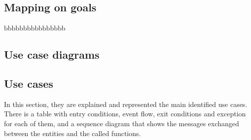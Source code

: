 \subsection{Mapping on goals}
\label{subsec:mapping_on_goals}%
bbbbbbbbbbbbbbbb

\subsection{Use case diagrams}
\label{subsec:use_case_diagrams}%
\subsection{Use cases}
\label{subsec: use_cases}%
\setcounter{uc}{1}
\newcommand{\cuc}{\theuc\stepcounter{uc}}
In this section, they are explained and represented the main identified use cases.
There is a table with entry conditions, event flow, exit conditions and exception for each of them, and a sequence diagram
that shows the messages exchanged between the entities and the called functions. \\

